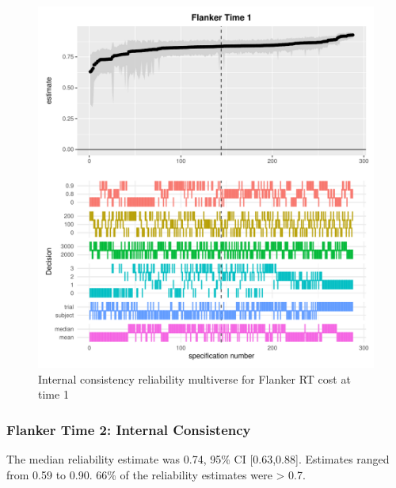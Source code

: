 \documentclass[
  english,
  man,floatsintext]{apa6}
\begin{document}
\begin{figure}
\centering
\includegraphics{Reliability_Multiverse_files/figure-latex/unnamed-chunk-8-1.pdf}
\caption{\label{fig:unnamed-chunk-8}Internal consistency reliability multiverse for Flanker RT cost at time 1}
\end{figure}

\newpage

\hypertarget{flanker-time-2-internal-consistency}{%
\subsubsection{Flanker Time 2: Internal Consistency}\label{flanker-time-2-internal-consistency}}

The median reliability estimate was 0.74, 95\% CI {[}0.63,0.88{]}. Estimates ranged from 0.59 to 0.90. 66\% of the reliability estimates were \textgreater{} 0.7.
\end{document}
